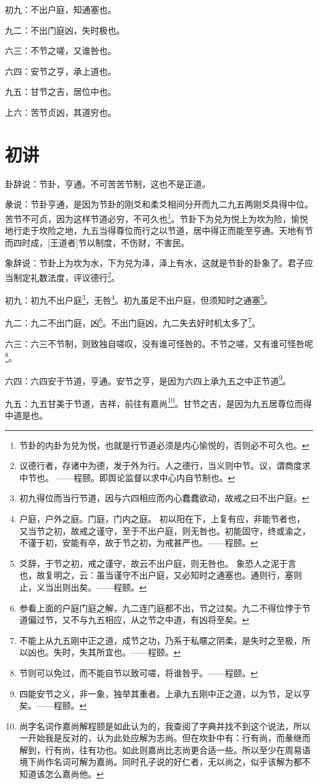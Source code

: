 \documentclass[12pt,oneside]{book}
\begin{document}
初九：不出户庭，知通塞也。

九二：不出门庭凶，失时极也。

六三：不节之嗟，又谁咎也。

六四：安节之亨，承上道也。

九五：甘节之吉，居位中也。

上六：苦节贞凶，其道穷也。


\section{初讲}
卦辞说：节卦，亨通。不可苦苦节制，这也不是正道。

彖说：节卦亨通，是因为节卦的刚爻和柔爻相间分开而九二九五两刚爻具得中位。苦节不可贞，因为这样节道必穷，不可久也\footnote{节卦的内卦为兑为悦，也就是行节道必须是内心愉悦的，否则必不可久也。}。节卦下为兑为悦上为坎为险，愉悦地行走于坎险之地，九五当得尊位而行之以节道，居中得正而能至亨通。天地有节而四时成，[王道者]节以制度，不伤财，不害民。

象辞说：节卦上为坎为水，下为兑为泽，泽上有水，这就是节卦的卦象了。君子应当制定礼数法度，评议德行\footnote{议德行者，存诸中为德，发于外为行。人之德行，当义则中节。议，谓商度求中节也。 ——程颐。即舆论监督以求中心内自节制也。}。


初九：初九不出户庭\footnote{初九得位而当行节道，因与六四相应而内心蠢蠢欲动，故戒之曰不出户庭。}，无咎\footnote{户庭，户外之庭。门庭，门内之庭。 初以阳在下，上复有应，非能节者也，又当节之初，故戒之谨守，至于不出户庭，则无咎也。初能固守，终或渝之，不谨于初，安能有卒，故于节之初，为戒甚严也。——程颐。}。初九虽足不出户庭，但须知时之通塞\footnote{爻辞，于节之初，戒之谨守，故云不出户庭，则无咎也。 象恐人之泥于言也，故复明之，云：虽当谨守不出户庭，又必知时之通塞也。通则行，塞则止，义当出则出矣。——程颐。}。

九二：九二不出门庭，凶\footnote{参看上面的户庭门庭之解，九二连门庭都不出，节之过矣。九二不得位悖于节道偏过节，又不与九五相应，从之节之中道，有凶将至矣。}。不出门庭凶，九二失去好时机太多了\footnote{不能上从九五刚中正之道，成节之功，乃系于私暱之阴柔，是失时之至极，所以凶也。失时，失其所宜也。——程颐。}。

六三：六三不节制，则致独自嗟叹，没有谁可怪咎的。不节之嗟，又有谁可怪咎呢\footnote{节则可以免过，而不能自节以致可嗟，将谁咎乎。——程颐。}。


六四：六四安于节道，亨通。安节之亨，是因为六四上承九五之中正节道\footnote{四能安节之义，非一象，独举其重者。上承九五刚中正之道，以为节，足以亨矣。——程颐。}。

九五：九五甘美于节道，吉祥，前往有嘉尚\footnote{尚字名词作嘉尚解程颐是如此认为的，我查阅了字典并找不到这个说法，所以一开始我是反对的，认为此处应解为志尚。但在坎卦中有：行有尚，而彖继而解到，行有尚，往有功也。如此则嘉尚比志尚更合适一些。所以至少在周易语境下尚作名词可解为嘉尚。同时孔子说的好仁者，无以尚之，似乎该解为都不知道该怎么嘉尚他。}。甘节之吉，是因为九五居尊位而得中道是也。
\end{document}
